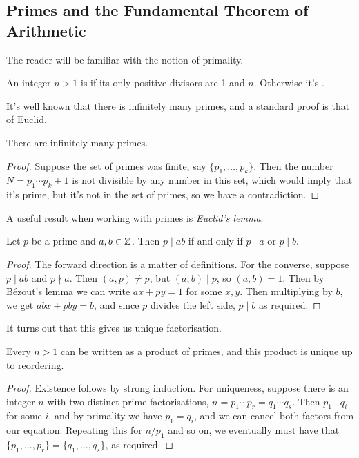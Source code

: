 \documentclass[a4paper]{scrartcl}
\begin{document}
\subsection{Primes and the Fundamental Theorem of Arithmetic}

The reader will be familiar with the notion of primality. 

\begin{definition}[Prime]
  An integer $n > 1$ is  if its only positive divisors are 1 and $n$. Otherwise it's .
\end{definition}

It's well known that there is infinitely many primes, and a standard proof is that of Euclid.

\begin{theorem}[Euclid]
  There are infinitely many primes.
\end{theorem}
\begin{proof}
  Suppose the set of primes was finite, say $\{p_1, \dots, p_k\}$. Then the number $N = p_1 \cdots p_k + 1$ is not divisible by any number in this set, which would imply that it's prime, but it's not in the set of primes, so we have a contradiction.
\end{proof}

A useful result when working with primes is \emph{Euclid's lemma}.

\begin{lemma}
  Let $p$ be a prime and $a, b\in \mathbb{Z}$. Then $p \mid ab$ if and only if $p \mid a$ or $p \mid b$.
\end{lemma}
\begin{proof}
  The forward direction is a matter of definitions. For the converse, suppose $p \mid ab$ and $p \nmid a$. Then $(a, p) \neq p$, but $(a, b) \mid p$, so $(a, b) = 1$. Then by Bézout's lemma we can write $ax + py = 1$ for some $x, y$. Then multiplying by $b$, we get $abx + pby = b$, and since $p$ divides the left side, $p \mid b$ as required.
\end{proof}

It turns out that this gives us unique factorisation.

\begin{theorem}
  Every $n > 1$ can be written as a product of primes, and this product is unique up to reordering.
\end{theorem}
\begin{proof}
  Existence follows by strong induction. For uniqueness, suppose there is an integer $n$ with two distinct prime factorisations, $n = p_1 \cdots p_r = q_1 \cdots q_s$. Then $p_1 \mid q_i$ for some $i$, and by primality we have $p_1 = q_i$, and we can cancel both factors from our equation. Repeating this for $n/p_1$ and so on, we eventually must have that $\{p_1,\dots,p_r\} = \{q_1, \dots, q_s\}$, as required.
\end{proof}
\end{document}
